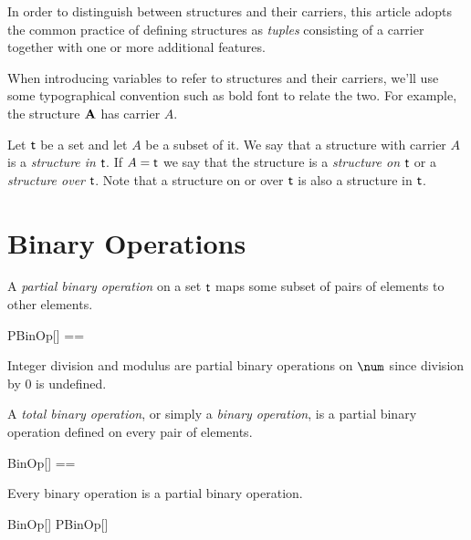 \documentclass{amsart}
\begin{document}
In order to distinguish between structures and their carriers, 
this article adopts the common practice of defining structures as \textit{tuples}
consisting of a carrier together with one or more additional features.

When introducing variables to refer to structures and their carriers,
we'll use some typographical convention such as bold font to relate the two.
For example, the structure $\mathbf{A}$ has carrier $A$.

Let $\mathsf{t}$ be a set and let $A$ be a subset of it.
We say that a structure with carrier $A$ is a \textit{structure in} $\mathsf{t}$.
If $A = \mathsf{t}$ we say that the structure is a \textit{structure on} $\mathsf{t}$
or a \textit{structure over} $\mathsf{t}$.
Note that a structure on or over $\mathsf{t}$ is also a structure in $\mathsf{t}$.

\section{Binary Operations}

A \textit{partial binary operation} on a set $\mathsf{t}$ maps some subset of pairs of elements to other elements.

\begin{zed}
	PBinOp[\genT] == \genT \cross \genT \pfun \genT
\end{zed}

\begin{example} Integer division and modulus are partial binary operations on $\num$ since division by $0$ is
undefined.


\end{example}

A \textit{total binary operation}, or simply a \textit{binary operation}, is a partial binary operation defined on
every pair of elements.

\begin{zed}
	BinOp[\genT] == \genT \cross \genT \fun \genT
\end{zed}

\begin{remark} Every binary operation is a partial binary operation.

\begin{zed}
	BinOp[\setT] \subseteq PBinOp[\setT]
\end{zed}

\end{remark}
\end{document}
